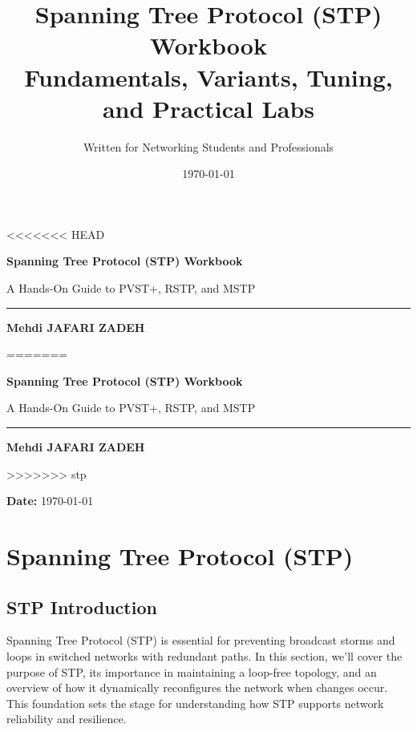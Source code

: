 \documentclass[a4paper]{book}
\title{\Huge \textbf{Spanning Tree Protocol (STP) Workbook}\\
       \Large Fundamentals, Variants, Tuning, and Practical Labs}
\author{\Large Written for Networking Students and Professionals}
\date{\today}
\begin{document}
\begin{titlepage}
<<<<<<< HEAD
    \centering
    \vspace*{4cm}
    {\Huge \textbf{Spanning Tree Protocol (STP) Workbook}\par}
    \vspace{0.8cm}
    {\Large A Hands-On Guide to PVST+, RSTP, and MSTP\par}
    \vspace{0.3cm}
    \rule{0.9\textwidth}{1pt}
    
    \vspace{0.6cm}
    {\large \textbf{Mehdi JAFARI ZADEH}}\par
    \vspace{0.3cm}
=======
	\centering
	\vspace*{4cm}
	{\Huge \textbf{Spanning Tree Protocol (STP) Workbook}\par}
	\vspace{0.8cm}
	{\Large A Hands-On Guide to PVST+, RSTP, and MSTP\par}
	\vspace{0.3cm}
	\rule{0.9\textwidth}{1pt}

	\vspace{0.6cm}
	{\large \textbf{Mehdi JAFARI ZADEH}}\par
	\vspace{0.3cm}
>>>>>>> stp


	\vfill
	\textbf{Date:} \today
	\vspace{2cm}
\end{titlepage}


\tableofcontents
\newpage

\chapter{Spanning Tree Protocol (STP)}

\section*{STP Introduction}

Spanning Tree Protocol (STP) is essential for preventing broadcast storms and loops in switched networks with redundant paths. In this section, we'll cover the purpose of STP, its importance in maintaining a loop-free topology, and an overview of how it dynamically reconfigures the network when changes occur. This foundation sets the stage for understanding how STP supports network reliability and resilience.
\end{document}
